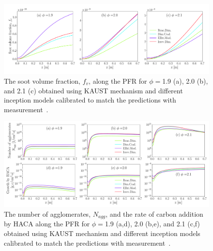 \begin{figure}[H]
	\centering
	\includegraphics[width=1\textwidth]{Figures/Results/PSR/f_v_eq_ratio_all_single_mech.pdf}
	\caption{The soot volume fraction, $f_v$, along the PFR for $\phi=$1.9 (a), 2.0 (b), and 2.1 (c) obtained using KAUST mechanism and different inception models calibrated to match the predictions with measurement~\citep{manzello2007soot}.}
	\label{fig:psrpfr_fv} 
\end{figure}


\begin{figure}[H]
	\centering
	\includegraphics[width=1\textwidth]{Figures/Results/PSR/N_agg_HACA_eq_ratio_all_single_mech.pdf}
	\caption{The number of agglomerates, $N_{agg}$, and the rate of carbon addition by HACA  along the PFR for $\phi=$1.9 (a,d), 2.0 (b,e), and 2.1 (c,f) obtained using KAUST mechanism and different inception models calibrated to match the predictions with measurement~\citep{manzello2007soot}.}
	\label{fig:psrpfr_Nagg_HACA} 
\end{figure}

